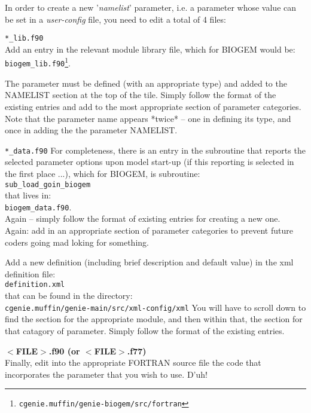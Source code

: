 \documentclass[10pt,twoside]{article}
\begin{document}
In order to create a new '\textit{namelist}' parameter, i.e. a parameter whose value can be set in a \textit{user-config} file, you need to edit a total of 4 files:
\begin{compactenum}
         
        \item \texttt{*\_lib.f90}
        \\Add an entry in the relevant module library file, which for BIOGEM would be:
        \\\texttt{biogem\_lib.f90}\footnote{\texttt{cgenie.muffin/genie-biogem/src/fortran}}.

        The parameter must be defined (with an appropriate type) and added to the NAMELIST section at the top of the tile. Simply follow the format of the existing entries and add to the most appropriate section of parameter categories.
        Note that the parameter name appears *twice* -- one in defining its type, and once in adding the the parameter NAMELIST.
        
        \item \texttt{*\_data.f90}
        For completeness, there is an entry in the subroutine that reports the selected parameter options upon model start-up (if this reporting is selected in the first place ...), which for BIOGEM, is subroutine:
        \\\texttt{sub\_load\_goin\_biogem}
        \\that lives in:
        \\\texttt{biogem\_data.f90}.\\Again -- simply follow the format of existing entries for creating a new one.        Again: add in an appropriate section of parameter categories to prevent future coders going mad loking for something.
        
        \item Add a new definition (including brief description and default value) in the xml definition file:
        \\\texttt{definition.xml}
        \\that can be found in the directory:
        \\\texttt{cgenie.muffin/genie-main/src/xml-config/xml}
        You will have to scroll down to find the section for the appropriate module, and then within that, the section for that catagory of parameter.
        Simply follow the format of the existing entries.
        
        \item \textbf{$<$FILE$>$.f90 (or $<$FILE$>$.f77)}
        \\Finally, edit into the appropriate FORTRAN source file the code that incorporates the parameter that you wish to use.
        D'uh!
               
\end{compactenum}
\end{document}
